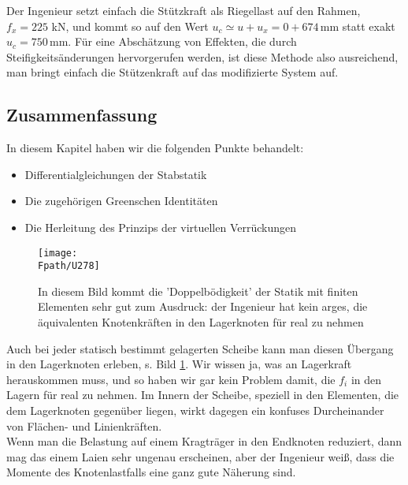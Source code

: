 {{{{Der Ingenieur setzt einfach die St\"{u}tzkraft als Riegellast auf den Rahmen, $f_x = 225$ kN, und kommt so auf den Wert $u_c \simeq u + u_x = 0 + 674$\,mm statt exakt $u_c = 750$\,mm. F\"{u}r eine Absch\"{a}tzung von Effekten, die durch Steifigkeits\"{a}nderungen hervorgerufen werden, ist diese Methode also ausreichend, man bringt einfach die St\"{u}tzenkraft auf das modifizierte System auf.
\\

{\textcolor{blau2}{\section{Zusammenfassung}}}
In diesem Kapitel haben wir die folgenden Punkte behandelt:
\begin{itemize}
  \item Differentialgleichungen der Stabstatik
  \item Die zugeh\"{o}rigen Greenschen Identit\"{a}ten
  \item Die Herleitung des Prinzips der virtuellen Verr\"{u}ckungen
\end{itemize}

\begin{figure}
\centering
{\texttt{[image: \\Fpath/U278]}}
  \caption{In diesem Bild kommt die 'Doppelb\"{o}digkeit' der Statik mit finiten Elementen sehr gut zum Ausdruck: der Ingenieur hat kein arges, die \"{a}quivalenten Knotenkr\"{a}ften in den Lagerknoten f\"{u}r real zu nehmen}
  \label{U278}
%
\end{figure}

Auch bei jeder statisch bestimmt gelagerten Scheibe kann man diesen \"{U}bergang in den Lagerknoten erleben, s. Bild \ref{U278}. Wir wissen ja, was an Lagerkraft herauskommen muss, und so haben wir gar kein Problem damit, die $f_i$ in den Lagern f\"{u}r real zu nehmen. Im Innern der Scheibe, speziell in den Elementen, die dem Lagerknoten gegen\"{u}ber liegen, wirkt dagegen ein konfuses Durcheinander von Fl\"{a}chen- und Linienkr\"{a}ften. \\

Wenn man die Belastung auf einem Kragtr\"{a}ger in den Endknoten reduziert, dann mag das einem Laien sehr ungenau erscheinen, aber der Ingenieur wei{\ss}, dass die Momente des Knotenlastfalls eine ganz gute N\"{a}herung sind.

}}}}
